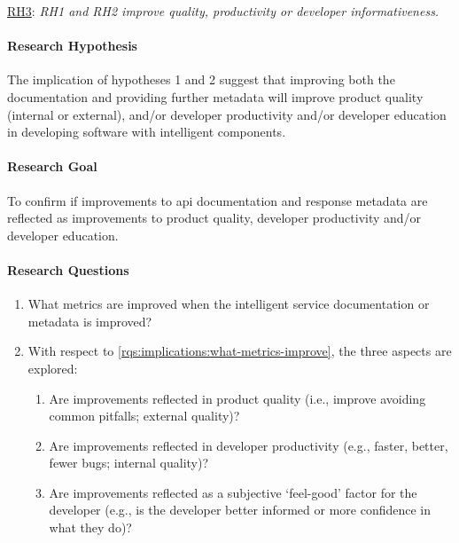 \begin{titled-frame}{\underline{RH3}: \textit{RH1 and RH2 improve quality,  productivity or developer informativeness.} }
\vspace{-12pt}
\paragraph{Research Hypothesis}
The implication of hypotheses 1 and 2 suggest that improving both the documentation and providing further metadata will improve product quality (internal or external), and/or developer productivity and/or developer education in developing software with intelligent components.

\paragraph{Research Goal}
 To confirm if improvements to \gls{api} documentation and response metadata  are reflected as improvements to product quality, developer productivity and/or developer education.
 
 \paragraph{Research Questions}
\begin{enumerate}[label=\textbf{RQ3.\arabic*.}, ref=RQ3.\arabic*, leftmargin=3.5\parindent, rightmargin=1\parindent]
  \item  What metrics are improved when the intelligent service documentation or metadata is improved?
  \label{rqs:implications:what-metrics-improve}
  
  \item With respect to \ref{rqs:implications:what-metrics-improve}, the three aspects are explored:
  \begin{enumerate}
  \item Are improvements reflected in product quality (i.e., improve avoiding common pitfalls; external quality)?
  \item Are improvements reflected in developer productivity (e.g., faster, better, fewer bugs; internal quality)?
  \item Are improvements reflected as a subjective `feel-good' factor for the developer (e.g., is the developer better informed or more confidence in what they do)?
  \end{enumerate}
  \label{rqs:implications:aspects}  
\end{enumerate}


\end{titled-frame}
